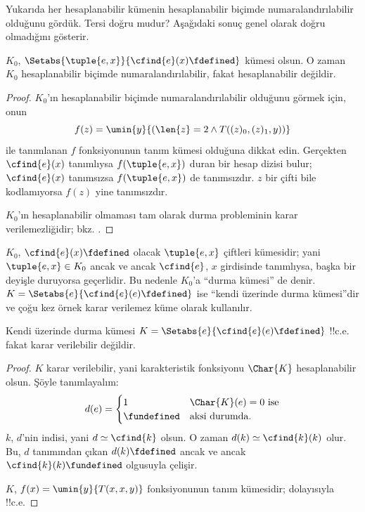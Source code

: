 


Yukarıda her hesaplanabilir kümenin hesaplanabilir biçimde
numaralandırılabilir olduğunu gördük. Tersi doğru mudur? Aşağıdaki sonuç
genel olarak doğru olmadığını gösterir.

\begin{thm}
$K_0$, $\Setabs{\tuple{e,x}}{\cfind{e}(x)\fdefined}$ kümesi olsun.
O zaman $K_0$ hesaplanabilir biçimde numaralandırılabilir, fakat
hesaplanabilir değildir.
\end{thm}

\begin{proof}
$K_0$'ın hesaplanabilir biçimde numaralandırılabilir olduğunu görmek için,
onun
\[
  f(z)=\umin{y}{(\len{z}=2\land T((z)_0,(z)_1,y))}
\]
ile tanımlanan $f$ fonksiyonunun tanım kümesi olduğuna dikkat edin.
Gerçekten $\cfind{e}(x)$ tanımlıysa $f(\tuple{e,x})$ duran bir hesap dizisi
bulur; $\cfind{e}(x)$ tanımsızsa $f(\tuple{e,x})$ de tanımsızdır. $z$ bir
çifti bile kodlamıyorsa $f(z)$ yine tanımsızdır.

$K_0$'ın hesaplanabilir olmaması tam olarak durma probleminin karar
verilemezliğidir; bkz. .
\end{proof}

$K_0$, $\cfind{e}(x)\fdefined$ olacak $\tuple{e,x}$ çiftleri kümesidir;
yani $\tuple{e,x}\in K_0$ ancak ve ancak $\cfind{e}$, $x$ girdisinde
tanımlıysa, başka bir deyişle duruyorsa geçerlidir. Bu nedenle $K_0$'a
``durma kümesi'' de denir. $K=\Setabs{e}{\cfind{e}(e)\fdefined}$ ise
``kendi üzerinde durma kümesi''dir ve çoğu kez örnek karar verilemez küme
olarak kullanılır.

\begin{thm}
Kendi üzerinde durma kümesi
$K=\Setabs{e}{\cfind{e}(e)\fdefined}$ !!{c.e.} fakat karar verilebilir
değildir.
\end{thm}

\begin{proof}
  $K$ karar verilebilir, yani karakteristik fonksiyonu $\Char{K}$
  hesaplanabilir olsun. Şöyle tanımlayalım:
  \[
    d(e)=\begin{cases}
      1 & \text{$\Char{K}(e)=0$ ise}\\
      \fundefined & \text{aksi durumda.}
    \end{cases}
  \]
  $k$, $d$'nin indisi, yani $d\simeq\cfind{k}$ olsun. O zaman
  $d(k)\simeq\cfind{k}(k)$ olur. Bu, $d$ tanımından çıkan
  $d(k)\fdefined$ ancak ve ancak $\cfind{k}(k)\fundefined$ olgusuyla
  çelişir.

  $K$, $f(x)=\umin{y}{T(x,x,y)}$ fonksiyonunun tanım kümesidir;
  dolayısıyla !!{c.e.}
\end{proof}


